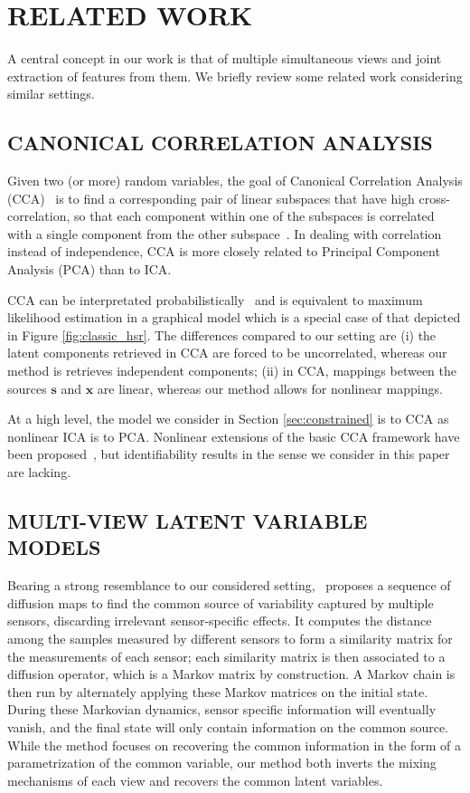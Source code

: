\documentclass[letterpaper]{article}
\theoremstyle{definition}
\begin{document}
\section{RELATED WORK}
\label{sec:related-work}
A central concept in our work is that of multiple simultaneous views and joint extraction of features from them. We briefly review some related work considering similar settings.
\subsection{CANONICAL CORRELATION ANALYSIS}
\label{sec:probacca}
Given two (or more) random variables, the goal of Canonical Correlation Analysis (CCA)~\cite{hotelling1992relations} is to find a corresponding pair of linear subspaces that have high cross-correlation, so that each component within one of the subspaces is correlated with a single component from the other subspace~\cite{bishop2006pattern}.
In dealing with correlation instead of independence, CCA is more closely related to Principal Component Analysis (PCA) than to ICA.

CCA can be interpretated probabilistically~\cite{bach2005probabilistic} and is equivalent to maximum likelihood estimation in a graphical model which is a special case of that depicted in Figure \ref{fig:classic_hsr}.
The differences compared to our setting are (i) the latent components retrieved in CCA are forced to be uncorrelated, whereas our method is retrieves independent components; (ii) in CCA, mappings between the sources $\bm{s}$ and $\bm{x}$ are linear, whereas our method allows for nonlinear mappings.

At a high level, the model we consider in Section \ref{sec:constrained} is to CCA as nonlinear ICA is to PCA.
Nonlinear extensions of the basic CCA framework have been proposed~\cite{lai2000kernel, fukumizu2007statistical, andrew2013deep, michaeli2016nonparametric}, but identifiability results in the sense we consider in this paper are lacking.



\subsection{MULTI-VIEW LATENT VARIABLE MODELS}


Bearing a strong resemblance to our considered setting,~\cite{lederman2018learning} proposes a sequence of diffusion maps to find the common source of variability captured by multiple sensors, discarding irrelevant sensor-specific effects.
It computes the distance among the samples measured by different sensors to form a similarity matrix for the measurements of each sensor; each similarity matrix is then associated to a diffusion operator, which is a Markov matrix by construction. A Markov chain is then run by alternately applying these Markov matrices on the initial state. During these Markovian dynamics, sensor specific information will eventually vanish, and the final state will only contain information on the common source.
While the method focuses on recovering the common information in the form of a parametrization of the common variable, our method both inverts the mixing mechanisms of each view and recovers the common latent variables.
\end{document}
